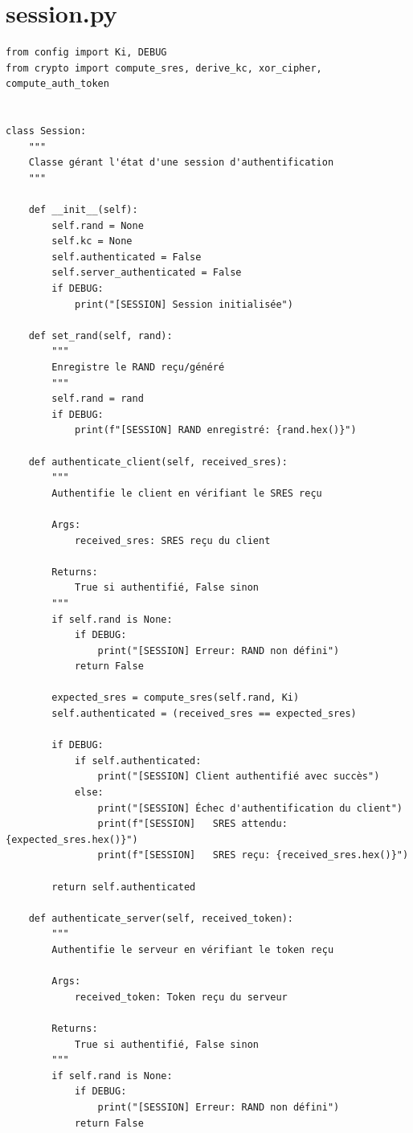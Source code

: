 \documentclass[12pt,a4paper]{report}
\begin{document}
\section{session.py}
\begin{verbatim}
from config import Ki, DEBUG
from crypto import compute_sres, derive_kc, xor_cipher, compute_auth_token


class Session:
    """
    Classe gérant l'état d'une session d'authentification
    """
    
    def __init__(self):
        self.rand = None
        self.kc = None
        self.authenticated = False
        self.server_authenticated = False
        if DEBUG:
            print("[SESSION] Session initialisée")
    
    def set_rand(self, rand):
        """
        Enregistre le RAND reçu/généré
        """
        self.rand = rand
        if DEBUG:
            print(f"[SESSION] RAND enregistré: {rand.hex()}")
    
    def authenticate_client(self, received_sres):
        """
        Authentifie le client en vérifiant le SRES reçu
        
        Args:
            received_sres: SRES reçu du client
        
        Returns:
            True si authentifié, False sinon
        """
        if self.rand is None:
            if DEBUG:
                print("[SESSION] Erreur: RAND non défini")
            return False
        
        expected_sres = compute_sres(self.rand, Ki)
        self.authenticated = (received_sres == expected_sres)
        
        if DEBUG:
            if self.authenticated:
                print("[SESSION] Client authentifié avec succès")
            else:
                print("[SESSION] Échec d'authentification du client")
                print(f"[SESSION]   SRES attendu: {expected_sres.hex()}")
                print(f"[SESSION]   SRES reçu: {received_sres.hex()}")
        
        return self.authenticated
    
    def authenticate_server(self, received_token):
        """
        Authentifie le serveur en vérifiant le token reçu
        
        Args:
            received_token: Token reçu du serveur
        
        Returns:
            True si authentifié, False sinon
        """
        if self.rand is None:
            if DEBUG:
                print("[SESSION] Erreur: RAND non défini")
            return False
        

\end{verbatim}
\end{document}
